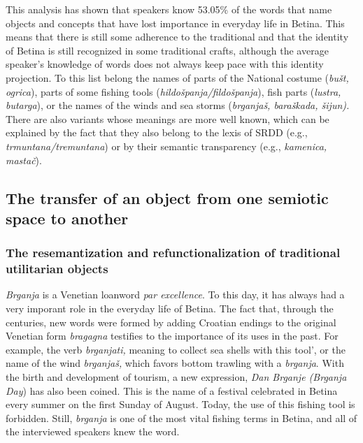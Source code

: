 \documentclass[output=paper]{LSP/langsci}
\begin{document}
This analysis has shown that speakers know 53.05\% of the words that name objects and concepts that have lost importance in everyday life in Betina. This means that there is still some adherence to the traditional and that the identity of Betina is still recognized in some traditional crafts, although the average speaker’s knowledge of words does not always keep pace with this identity projection. To this list belong the names of parts of the National costume (\textit{bušt, ogrica}), parts of some fishing tools (\textit{hildošpanja/fildošpanja}), fish parts (\textit{lustra, butarga}), or the names of the winds and sea storms (\textit{brganjaš, baraškada, šijun). }There are also variants whose meanings are more well known, which can be explained by the fact that they also belong to the lexis of SRDD (e.g., \textit{trmuntana/tremuntana}) or by their semantic transparency (e.g., \textit{kamenica, mastač}). 

\subsection{The transfer of an object from one semiotic space to another}
\subsubsection{The resemantization and refunctionalization of traditional utilitarian objects}

\textit{Brganja} is a Venetian loanword \textit{par excellence}. To this day, it has always had a very imporant role in the everyday life of Betina. The fact that, through the centuries, new words were formed by adding Croatian endings to the original Venetian form \textit{bragagna} testifies to the importance of its uses in the past. For example, the verb \textit{brganjati, }meaning to collect sea shells with this tool', or the name of the wind \textit{brganjaš, }which favors bottom trawling with a \textit{brganja}. With the birth and development of tourism, a new expression, \textit{Dan Brganje (Brganja Day}) has also been coined. This is the name of a festival celebrated in Betina every summer on the first Sunday of August. Today, the use of this fishing tool is forbidden. Still, \textit{brganja} is one of the most vital fishing terms in Betina, and all of the interviewed speakers knew the word. 
\end{document}
